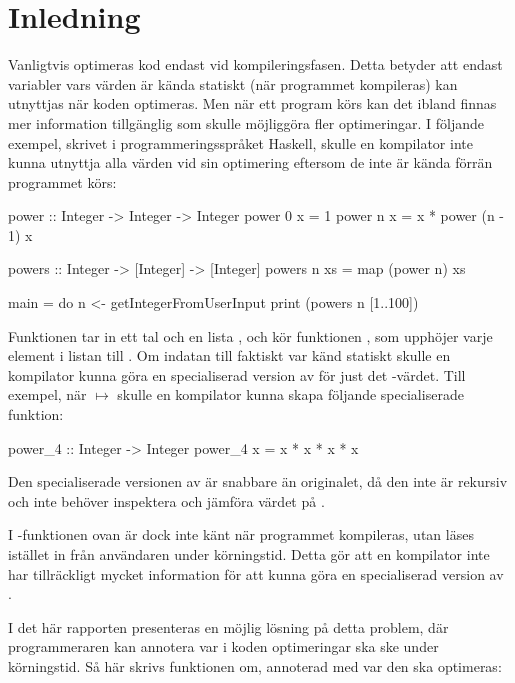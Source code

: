 \documentclass[Rapport]{subfiles}
\begin{document}
\chapter{Inledning}

Vanligtvis optimeras kod endast vid kompileringsfasen. Detta betyder att endast variabler
vars värden är kända statiskt (när programmet kompileras) kan utnyttjas när koden optimeras. Men när ett program 
körs kan det ibland finnas mer information tillgänglig som skulle möjliggöra 
fler optimeringar. I följande exempel, skrivet
i programmeringsspråket Haskell, skulle en kompilator inte kunna
utnyttja alla värden vid sin optimering eftersom de inte är kända förrän programmet körs:

\begin{codeEx}
power :: Integer -> Integer -> Integer
power 0 x = 1
power n x = x * power (n - 1) x

powers :: Integer -> [Integer] -> [Integer]
powers n xs = map (power n) xs

main = do
    n <- getIntegerFromUserInput
    print (powers n [1..100])

\end{codeEx}

Funktionen  tar in ett tal 
och en lista , och kör funktionen , 
som upphöjer varje element i listan till . 
Om indatan  till 
 faktiskt var känd statiskt skulle en kompilator kunna 
göra en specialiserad version av  för just det -värdet. Till exempel, när  $\mapsto$ 
skulle en kompilator kunna skapa följande specialiserade funktion:

\begin{codeEx}
power_4 :: Integer -> Integer
power_4 x = x * x * x * x
\end{codeEx}

Den specialiserade versionen av  är snabbare än originalet, då den inte är 
rekursiv och inte behöver inspektera och jämföra värdet på .

I -funktionen ovan är dock  inte känt när programmet kompileras, utan läses 
istället in från användaren under körningstid. Detta gör att en kompilator inte 
har tillräckligt mycket information för att kunna göra en specialiserad version av .

I det här rapporten presenteras en möjlig lösning på detta problem,
där programmeraren kan annotera var i koden optimeringar ska ske under körningstid.
Så här skrivs funktionen  om,
annoterad med var den ska optimeras:
\end{document}
